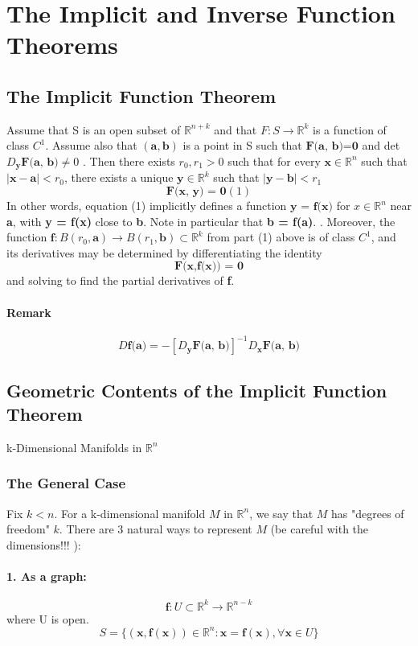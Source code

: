 \documentclass[11pt]{article}
\newcommand{\tb}[1]{\textbf{#1}}
\newcommand{\real}[0]{\mathbb{R}}
\newcommand{\func}[3]{\tb{#1}: {#2} \rightarrow {#3} }
\begin{document}
\section{The Implicit and Inverse Function Theorems}
\subsection{The Implicit Function Theorem}
Assume that S is an open subset of $\real^{n+k}$ and that $F: S \rightarrow \real^k$ is a function of class $C^1$. Assume also that $(\tb{a}, \tb{b})$ is a point in S such that $\tb{F(a, b)=0}$ and det$D_{\tb{y}}\tb{F(a, b)} \neq 0$ . Then there exists $r_0, r_1 > 0$ such that for every $\tb{x} \in \real^n$ such that $|\tb{x} - \tb{a}| < r_0$, there exists a unique $\tb{y} \in \real^k$ such that $|\tb{y} - \tb{b}| < r_1$
    $$\tb{F(x, y) = 0} (1)$$
    In other words, equation (1) implicitly defines a function $\tb{y = f(x)}$ for $x \in \real^n$ near \tb{a}, with \tb{y = f(x)} close to \tb{b}. Note in particular that \tb{b = f(a)}. . Moreover, the function $\tb{f}: B(r_0,\tb{a}) \rightarrow B(r_1, \tb{b}) \subset \real^k$ from part (1) above is of class $C^1$, and its derivatives may be determined by differentiating the identity $$\tb{F(x,f(x)) = 0}$$ and solving to find the partial derivatives of \tb{f}.
\paragraph{Remark} $$D\tb{f(a)} = -[D_\tb{y}\tb{F(a, b)}]^{-1}D_\tb{x}\tb{F(a, b)}$$


\subsection{Geometric Contents of the Implicit Function Theorem}
k-Dimensional Manifolds in $\real^n$
\subsubsection{The General Case}
Fix $k < n$. For a k-dimensional manifold $M$ in $\real^n$, we say that $M$ has "degrees of freedom" $k$. There are 3 natural ways to represent $M$ (be careful with the dimensions!!! ):
\paragraph{1. As a \tb{graph}:}
        $$\func{f}{U \subset \real^k}{\real^{n-k}}$$ where U is open.
        $$ S = \{(\tb{x}, \tb{f}(\tb{x})) \in \real^n: \tb{x} = \tb{f}(\tb{x}), \forall \tb{x} \in U \}$$
\end{document}
